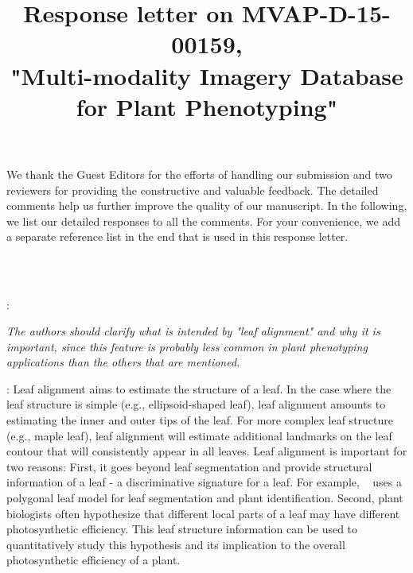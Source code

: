 \documentclass[11pt,letterpaper]{article}
\title{Response letter on MVAP-D-15-00159, \\"Multi-modality Imagery Database for Plant Phenotyping"}
\newcounter{reviewcounter}
\newenvironment{review}
{\noindent {\bf Comment~\arabic{reviewcounter}}:\addtocounter{reviewcounter}{1}\itshape}
{\vspace{0.8em}}
\newenvironment{response}
{\noindent {\bf Response}: \color{black}}
{\color{black} \vspace{1.6em}}
\begin{document}
\maketitle

{%
We thank the Guest Editors for the efforts of handling our submission and two reviewers for providing the constructive and valuable feedback.
The detailed comments help us further improve the quality of our manuscript.
In the following, we list our detailed responses to all the comments.
For your convenience, we add a separate reference list in the end that is used in this response letter.
}


\vspace{2em}
\\
\begin{tabular*}{\textwidth}{c}
\hline
\end{tabular*}

\begin{review}
The authors should clarify what is intended by "leaf alignment" and why it is important, since this feature is probably less common in plant phenotyping applications than the others that are mentioned.
\end{review}

\begin{response}
Leaf alignment aims to estimate the structure of a leaf.
In the case where the leaf structure is simple (e.g., ellipsoid-shaped leaf), leaf alignment amounts to estimating the inner and outer tips of the leaf.
For more complex leaf structure (e.g., maple leaf), leaf alignment will estimate additional landmarks on the leaf contour that will consistently appear in all leaves.
Leaf alignment is important for two reasons:
First, it goes beyond leaf segmentation and provide structural information of a leaf - a discriminative signature for a leaf.
For example, ~\cite{cerutti2013understanding} uses a polygonal leaf model for leaf segmentation and plant identification.
Second, plant biologists often hypothesize that different local parts of a leaf may have different photosynthetic efficiency.
This leaf structure information can be used to quantitatively study this hypothesis and its implication to the overall photosynthetic efficiency of a plant.
\end{response}
\end{document}
